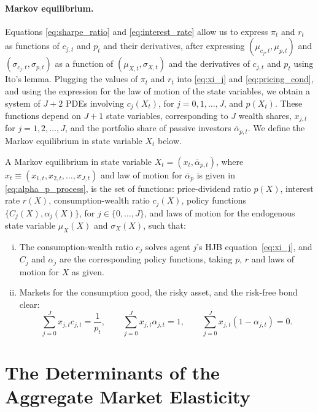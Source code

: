 \paragraph{Markov equilibrium.}
Equations \eqref{eq:sharpe_ratio} and \eqref{eq:interest_rate} allow us to express $\pi_{t}$ and $r_t$ as functions of $c_{j,t}$ and $p_t$ and their derivatives, after expressing $(\mu_{c_j,t}, \mu_{p,t})$ and $(\sigma_{c_j,t},\sigma_{p,t})$ as a function of $(\mu_{X,t}, \sigma_{X,t})$ and the derivatives of $c_{j,t}$ and $p_t$ using Ito's lemma. Plugging the values of $\pi_t$ and $r_t$ into \eqref{eq:xi_j} and \eqref{eq:pricing_cond}, and using the expression for the law of motion of the state variables, we obtain a system of $J+2$ PDEs involving $c_{j}(X_t)$, for $j = 0,1,\ldots, J$, and $p(X_t)$. These functions depend on $J+1$ state variables, corresponding to $J$ wealth shares, $x_{j,t}$ for $j = 1,2,\ldots,J $, and the portfolio share of passive investors $\overline{\alpha}_{p,t}$.
We define the Markov equilibrium in state variable $X_t$ below.
\begin{defn}
A Markov equilibrium in state variable $X_t=\left(x_t, \overline{\alpha}_{p,t}\right)$, where $x_{t} \equiv\left(x_{1, t}, x_{2, t}, \ldots, x_{J, t}\right)$ and law of motion for $\overline{\alpha}_p$ is given in \eqref{eq:alpha_p_process}, is the set of functions: price-dividend ratio $p(X)$, interest rate $r(X)$, consumption-wealth ratio $c_j(X)$, policy functions $\{C_j(X), \alpha_j(X)\}$, for $j\in\{0,\ldots,J\}$, and laws of motion for the endogenous state variable $\mu_X(X)$ and $\sigma_X(X)$, such that:
\begin{enumerate}[(i)]
    \item The consumption-wealth ratio $c_j$ solves agent $j$'s HJB equation~\eqref{eq:xi_j}, and $C_j$ and $\alpha_j$ are the corresponding policy functions, taking $p$, $r$ and laws of motion for $X$ as given.
    \item Markets for the consumption good, the risky asset, and the risk-free bond clear:
    \begin{equation}
        \sum_{j=0}^{J} x_{j, t} c_{j, t}=\frac{1}{p_t}, \qquad 
    \sum_{j=0}^{J} x_{j, t} \alpha_{j, t}=1,\qquad 
    \sum_{j=0}^{J} x_{j, t} (1-\alpha_{j,t})=0.\label{eq:mkt-clearing}
    \end{equation}
\end{enumerate}
\end{defn}

\section{The Determinants of the Aggregate Market Elasticity}\label{sec:elasticity}


